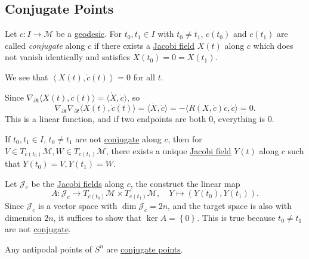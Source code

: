 \subsection{Conjugate Points}
\begin{definition}\label{def:conjugate-point}
	Let \(c\colon I \to \mathcal{M} \) be a \hyperref[def:geodesic]{geodesic}. For \(t_0, t_1\in I\) with \(t_0 \neq t_1\), \(c(t_0)\) and \(c(t_1)\) are called \emph{conjugate} along \(c\) if there exists a \hyperref[def:Jacobi-field]{Jacobi field} \(X(t)\) along \(c\) which does not vanish identically and satisfies \(X(t_0) = 0 = X(t_1)\).
\end{definition}

\begin{note}
	We see that \(\left\langle X(t), \dot{c} (t) \right\rangle = 0\) for all \(t\).
\end{note}
\begin{explanation}
	Since \(\nabla _{\partial t} \langle X(t) , \dot{c} (t) \rangle = \langle \dot{X} , \dot{c} \rangle \), so
	\[
		\nabla _{\partial t} \nabla _{\partial t} \langle X(t), \dot{c} (t)\rangle
		= \langle \ddot{X}, \dot{c}  \rangle
		= -\langle R(X, \dot{c}) \dot{c}, \dot{c}\rangle = 0.
	\]
	This is a linear function, and if two endpoints are both \(0\), everything is \(0\).
\end{explanation}

\begin{note}
	If \(t_0, t_1\in I\), \(t_0 \neq t_1\) are not \hyperref[def:conjugate-point]{conjugate} along \(c\), then for \(V\in T_{c(t_0)} \mathcal{M}, W\in T_{c(t_1)} \mathcal{M} \), there exists a unique \hyperref[def:Jacobi-field]{Jacobi field} \(Y(t)\) along \(c\) such that \(Y(t_0) = V, Y(t_1)=W\).
\end{note}
\begin{explanation}
	Let \(\mathcal{J} _c\) be the \hyperref[def:Jacobi-field]{Jacobi fields} along \(c\), the construct the linear map
	\[
		A\colon \mathcal{J} _c \to T_{c(t_0)} \mathcal{M} \times T_{c(t_1)} \mathcal{M} ,\quad
		Y \mapsto (Y(t_0), Y(t_1)).
	\]
	Since \(\mathcal{J} _c\) is a vector space with \(\dim \mathcal{J} _c = 2n\), and the target space is also with dimension \(2n\), it suffices to show that \(\ker A = \left\{ 0 \right\} \). This is true because \(t_0 \neq t_1\) are not \hyperref[def:conjugate-point]{conjugate}.
\end{explanation}

\begin{eg}
	Any antipodal points of \(S^n\) are \hyperref[def:conjugate-point]{conjugate points}.
\end{eg}

